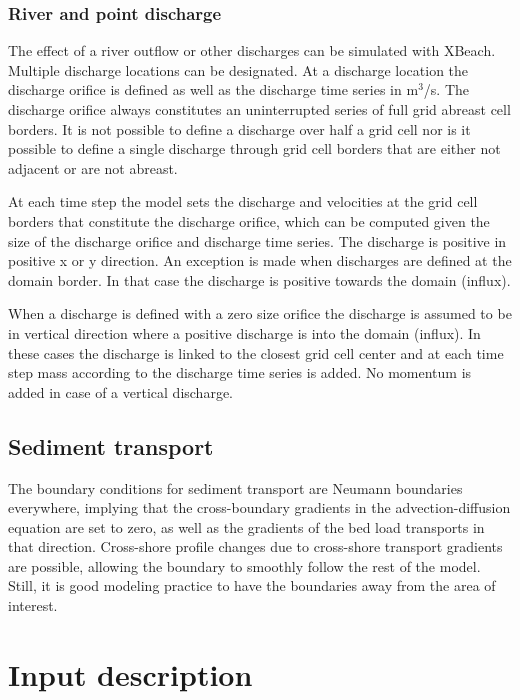 \documentclass{article}
\begin{document}
\subsubsection{ River and point discharge}

\noindent The effect of a river outflow or other discharges can be simulated with XBeach. Multiple discharge locations can be designated. At a discharge location the discharge orifice is defined as well as the discharge time series in m${}^{3}$/s. The discharge orifice always constitutes an uninterrupted series of full grid abreast cell borders. It is not possible to define a discharge over half a grid cell nor is it possible to define a single discharge through grid cell borders that are either not adjacent or are not abreast.

\noindent At each time step the model sets the discharge and velocities at the grid cell borders that constitute the discharge orifice, which can be computed given the size of the discharge orifice and discharge time series. The discharge is positive in positive x or y direction. An exception is made when discharges are defined at the domain border. In that case the discharge is positive towards the domain (influx).

\noindent When a discharge is defined with a zero size orifice the discharge is assumed to be in vertical direction where a positive discharge is into the domain (influx). In these cases the discharge is linked to the closest grid cell center and at each time step mass according to the discharge time series is added. No momentum is added in case of a vertical discharge.


\subsection{ Sediment transport}

\noindent The boundary conditions for sediment transport are Neumann boundaries everywhere, implying that the cross-boundary gradients in the advection-diffusion equation are set to zero, as well as the gradients of the bed load transports in that direction. Cross-shore profile changes due to cross-shore transport gradients are possible, allowing the boundary to smoothly follow the rest of the model. Still, it is good modeling practice to have the boundaries away from the area of interest. \eject 


\section{ Input description}
\end{document}
